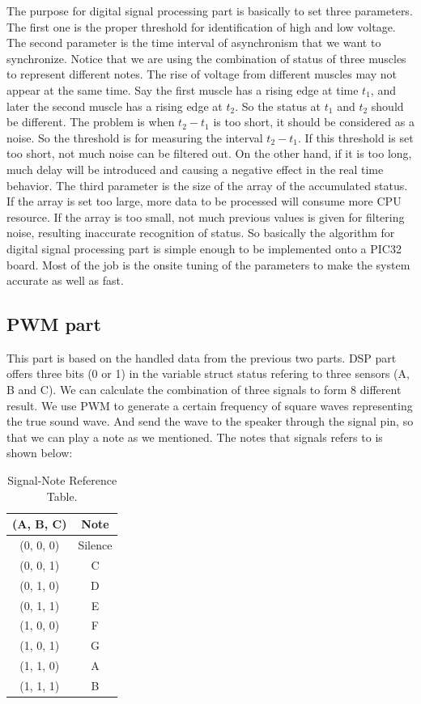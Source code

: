 \documentclass[12pt]{article}
\begin{document}
The purpose for digital signal processing part is basically to set three parameters. The first one is the proper threshold for identification of high and low voltage. The second parameter is the time interval of asynchronism that we want to synchronize. Notice that we are using the combination of status of three muscles to represent different notes. The rise of voltage from different muscles may not appear at the same time. Say the first muscle has a rising edge at time $t_1$, and later the second muscle has a rising edge at $t_2$. So the status at $t_1$ and $t_2$ should be different. The problem is when $t_2-t_1$ is too short, it should be considered as a noise. So the threshold is for measuring the interval $t_2-t_1$. If this threshold is set too short, not much noise can be filtered out. On the other hand, if it is too long, much delay will be introduced and causing a negative effect in the real time behavior. The third parameter is the size of the array of the accumulated status. If the array is set too large, more data to be processed will consume more CPU resource. If the array is too small, not much previous values is given for filtering noise, resulting inaccurate recognition of status. So basically the algorithm for digital signal processing part is simple enough to be implemented onto a PIC32 board. Most of the job is the onsite tuning of the parameters to make the system accurate as well as fast.

\subsection{PWM part}

This part is based on the handled data from the previous two parts. DSP part offers three bits (0 or 1) in the variable struct status refering to three sensors (A, B and C). We can calculate the combination of three signals to form 8 different result. We use PWM to generate a certain frequency of square waves representing the true sound wave. And send the wave to the speaker through the signal pin, so that we can play a note as we mentioned. The notes that signals refers to is shown below:

\begin{table}[H]
\centering
\begin{tabular}{cc}
(A, B, C) & Note \\\hline
(0, 0, 0) & Silence \\
(0, 0, 1) & C \\
(0, 1, 0) & D \\
(0, 1, 1) & E \\
(1, 0, 0) & F \\
(1, 0, 1) & G \\
(1, 1, 0) & A \\
(1, 1, 1) & B \\
\end{tabular}
\caption{Signal-Note Reference Table.}
\end{table} 
\end{document}
